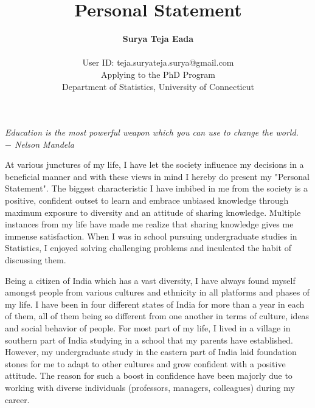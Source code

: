 \documentclass[10pt]{article}
\begin{document}
\title{Personal Statement}
\date{}
\author{{\bf Surya Teja Eada} \\  \ \ \\ {\small User ID: teja.suryateja.surya@gmail.com }\\ {\small Applying to the PhD Program } \\ {\small Department of Statistics, University of Connecticut} }
\maketitle

\begin{flushright}

{\it Education is the most powerful weapon which you can use to change the world.\\ $-$ Nelson Mandela}


\end{flushright}

At various junctures of my life, I have let the society influence my decisions in a beneficial manner and with these views in mind I hereby do present my "Personal Statement". The biggest characteristic I have imbibed in me from the society is a positive, confident outset to learn and embrace unbiased knowledge through maximum exposure to diversity and an attitude of sharing knowledge. Multiple instances from my life have made me realize that sharing knowledge gives me immense satisfaction. When I was in school pursuing undergraduate studies in Statistics, I enjoyed solving challenging problems and inculcated the habit of discussing them. 

Being a citizen of India which has a vast diversity, I have always found myself amongst people from various cultures and ethnicity in all platforms and phases of my life. I have been in four different states of India for more than a year in each of them, all of them being so different from one another in terms of culture, ideas and social behavior of people. For most part of my life, I lived in a village in southern part of India studying in a school that my parents have established. However, my undergraduate study in the eastern part of India laid foundation stones for me to adapt to other cultures and grow confident with  a positive attitude. The reason for such a boost in confidence have been majorly due to working with diverse individuals (professors, managers, colleagues) during my career.
\end{document}
